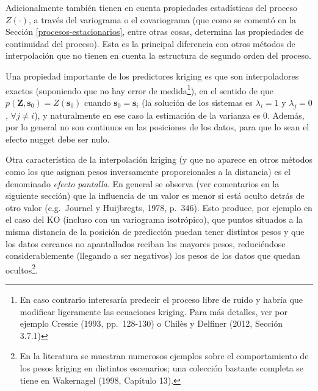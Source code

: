 \documentclass[
  spanish,
]{book}
\theoremstyle{break}
\theoremstyle{definition}
\theoremstyle{definition}
\theoremstyle{definition}
\theoremstyle{definition}
\theoremstyle{remark}
\begin{document}
Adicionalmente también tienen en cuenta propiedades estadísticas del proceso \(Z(\cdot)\), a través del variograma o el covariograma (que como se comentó en la Sección \ref{procesos-estacionarios}, entre otras cosas, determina las propiedades de continuidad del proceso).
Esta es la principal diferencia con otros métodos de interpolación que no tienen en cuenta la estructura de segundo orden del proceso.

Una propiedad importante de los predictores kriging es que son interpoladores exactos (suponiendo que no hay error de medida\footnote{En caso contrario interesaría predecir el proceso libre de ruido y habría que modificar ligeramente las ecuaciones kriging. Para más detalles, ver por ejemplo Cressie (1993, pp.~128-130) o Chilès y Delfiner (2012, Sección 3.7.1)}), en el sentido de que \(p(\mathbf{Z},\mathbf{s}_{0})=Z(\mathbf{s}_{0})\) cuando \(\mathbf{s}_{0}=\mathbf{s}_{i}\) (la solución de los sistemas es \(\lambda_{i} =1\) y \(\lambda_{j} =0\), \(\forall j\neq i\)), y naturalmente en ese caso la estimación de la varianza es 0.
Además, por lo general no son continuos en las posiciones de los datos, para que lo sean el efecto nugget debe ser nulo.

Otra característica de la interpolación kriging (y que no aparece en otros métodos como los que asignan pesos inversamente proporcionales a la distancia) es el denominado \emph{efecto pantalla}.
En general se observa (ver comentarios en la siguiente sección) que la influencia de un valor es menor si está oculto detrás de otro valor (e.g.~Journel y Huijbregts, 1978, p.~346).
Esto produce, por ejemplo en el caso del KO (incluso con un variograma isotrópico), que puntos situados a la misma distancia de la posición de predicción puedan tener distintos pesos y que los datos cercanos no apantallados reciban los mayores pesos, reduciéndose considerablemente (llegando a ser negativos) los pesos de los datos que quedan ocultos\footnote{En la literatura se muestran numerosos ejemplos sobre el comportamiento de los pesos kriging en distintos escenarios; una colección bastante completa se tiene en Wakernagel (1998, Capítulo 13).}.
\end{document}
